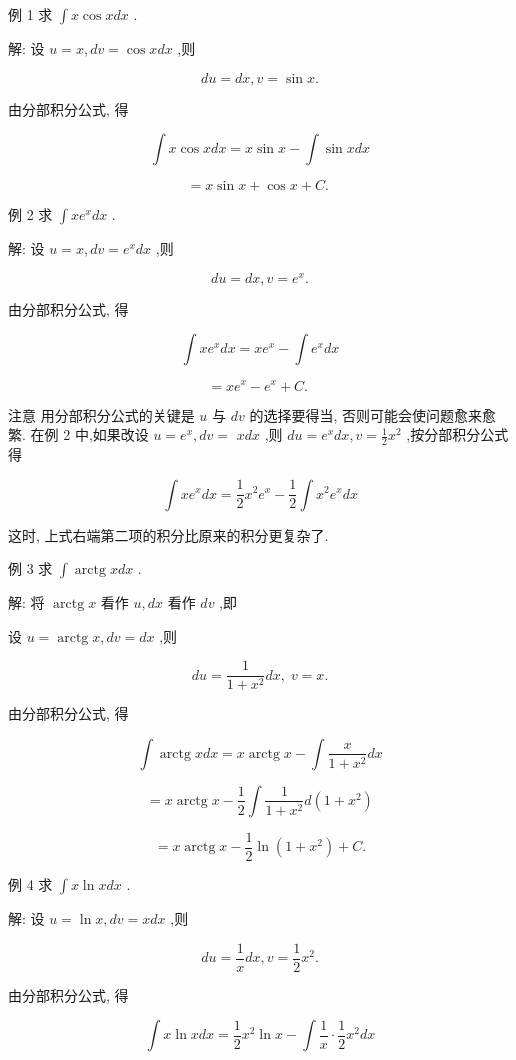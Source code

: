\documentclass[lang=cn,newtx,10pt,scheme=chinese]{elegantbook}
\begin{document}
例 1 求 \(\int x\cos {xdx}\) .

解: 设 \(u = x,{dv} = \cos {xdx}\) ,则

\[
{du} = {dx},v = \sin x.
\]

由分部积分公式, 得

\[
\int x\cos {xdx} = x\sin x - \int \sin {xdx}
\]

\[
= x\sin x + \cos x + C\text{. }
\]

例 2 求 \(\int x{e}^{x}{dx}\) .

解: 设 \(u = x,{dv} = {e}^{x}{dx}\) ,则

\[
{du} = {dx},v = {e}^{x}.
\]

由分部积分公式, 得

\[
\int x{e}^{x}{dx} = x{e}^{x} - \int {e}^{x}{dx}
\]

\[
= x{e}^{x} - {e}^{x} + C\text{. }
\]

注意 用分部积分公式的关键是 \(u\) 与 \({dv}\) 的选择要得当, 否则可能会使问题愈来愈繁. 在例 2 中,如果改设 \(u = {e}^{x},{dv} =\) \({xdx}\) ,则 \({du} = {e}^{x}{dx},v = \frac{1}{2}{x}^{2}\) ,按分部积分公式得

\[
\int x{e}^{x}{dx} = \frac{1}{2}{x}^{2}{e}^{x} - \frac{1}{2}\int {x}^{2}{e}^{x}{dx}
\]

这时, 上式右端第二项的积分比原来的积分更复杂了.

例 3 求 \(\int \operatorname{arctg}{xdx}\) .

解: 将 \(\operatorname{arctg}x\) 看作 \(u,{dx}\) 看作 \({dv}\) ,即

设 \(u = \operatorname{arctg}x,{dv} = {dx}\) ,则

\[
{du} = \frac{1}{1 + {x}^{2}}{dx},\;v = x.
\]

由分部积分公式, 得

\[
\int \operatorname{arctg}{xdx} = x\operatorname{arctg}x - \int \frac{x}{1 + {x}^{2}}{dx}
\]

\[
= x\operatorname{arctg}x - \frac{1}{2}\int \frac{1}{1 + {x}^{2}}d\left( {1 + {x}^{2}}\right)
\]

\[
= x\operatorname{arctg}x - \frac{1}{2}\ln \left( {1 + {x}^{2}}\right) + C\text{.}
\]

例 4 求 \(\int x\ln {xdx}\) .

解: 设 \(u = \ln x,{dv} = {xdx}\) ,则

\[
{du} = \frac{1}{x}{dx},v = \frac{1}{2}{x}^{2}.
\]

由分部积分公式, 得

\[
\int x\ln {xdx} = \frac{1}{2}{x}^{2}\ln x - \int \frac{1}{x} \cdot \frac{1}{2}{x}^{2}{dx}
\]
\end{document}
